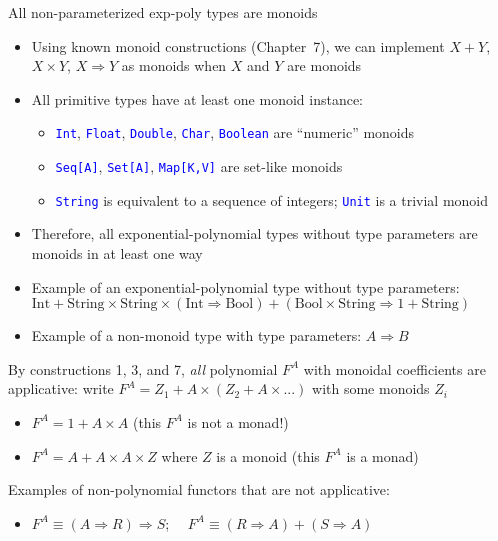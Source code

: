 \documentclass[english]{beamer}
\begin{document}
\begin{frame}{All non-parameterized exp-poly types are monoids}
\begin{itemize}
\item \vspace{-0.1cm}Using known monoid constructions (Chapter\ 7), we
can implement $X+Y$, $X\times Y$, $X\Rightarrow Y$ as monoids when
$X$ and $Y$ are monoids
\item All primitive types have at least one monoid instance:
\begin{itemize}
\item \texttt{\textcolor{blue}{\footnotesize{}Int}}, \texttt{\textcolor{blue}{\footnotesize{}Float}},
\texttt{\textcolor{blue}{\footnotesize{}Double}}, \texttt{\textcolor{blue}{\footnotesize{}Char}},
\texttt{\textcolor{blue}{\footnotesize{}Boolean}} are ``numeric''
monoids
\item \texttt{\textcolor{blue}{\footnotesize{}Seq{[}A{]}}}, \texttt{\textcolor{blue}{\footnotesize{}Set{[}A{]}}},
\texttt{\textcolor{blue}{\footnotesize{}Map{[}K,V{]}}} are set-like
monoids
\item \texttt{\textcolor{blue}{\footnotesize{}String}} is equivalent to
a sequence of integers; \texttt{\textcolor{blue}{\footnotesize{}Unit}}
is a trivial monoid
\end{itemize}
\item Therefore, all exponential-polynomial types without type parameters
are monoids in at least one way
\item Example of an exponential-polynomial type without type parameters:
{\footnotesize{}$\text{Int}+\text{String}\times\text{String}\times\left(\text{Int}\Rightarrow\text{Bool}\right)+\left(\text{Bool}\times\text{String}\Rightarrow1+\text{String}\right)$} 
\item Example of a non-monoid type with type parameters: $A\Rightarrow B$
\end{itemize}
By constructions 1, 3, and 7, \emph{all} polynomial $F^{A}$ with
monoidal coefficients are applicative: write $F^{A}=Z_{1}+A\times\left(Z_{2}+A\times...\right)$
with some monoids $Z_{i}$
\begin{itemize}
\item $F^{A}=1+A\times A$ (this $F^{A}$ is not a monad!)
\item $F^{A}=A+A\times A\times Z$ where $Z$ is a monoid (this $F^{A}$
is a monad)
\end{itemize}
Examples of non-polynomial functors that are not applicative:
\begin{itemize}
\item $F^{A}\equiv\left(A\Rightarrow R\right)\Rightarrow S$; $\quad F^{A}\equiv\left(R\Rightarrow A\right)+\left(S\Rightarrow A\right)$
\end{itemize}
\end{frame}
\end{document}
